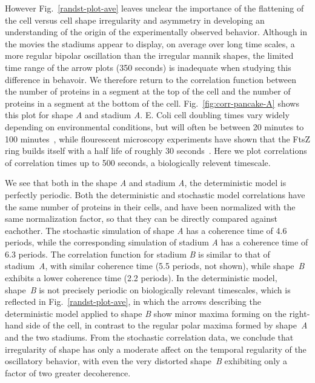 \documentclass{pnastwo}
\begin{document}
\begin{article}
However Fig.~\ref{randst-plot-ave} leaves unclear the importance of
the flattening of the cell versus cell shape irregularity and
asymmetry in developing an understanding of the origin of the
experimentally observed behavior.  Although in the movies the stadiums
appear to display, on average over long time scales, a more regular
bipolar oscillation than the irregular mannik shapes, the limited time
range of the arrow plots (350 seconds) is inadequate when studying
this difference in behavoir.  We therefore return to the correlation
function between the number of proteins in a segment at the top of the
cell and the number of proteins in a segment at the bottom of the
cell.  Fig.~\ref{fig:corr-pancake-A} shows this plot for shape
\emph{A} and stadium \emph{A}.  E. Coli cell doubling times vary
widely depending on environmental conditions, but will often be
between 20 minutes to 100 minutes~\cite{pierucci1972chromosome}, while
flourescent microscopy experiments have shown that the FtsZ ring
builds itself with a half life of roughly 30
seconds~\cite{stricker2002rapid}.  Here we plot correlations of
correlation times up to 500 seconds, a biologically relevent
timescale.


We see that both in the shape \emph{A} and stadium \emph{A}, the
deterministic model is perfectly periodic.  Both the deterministic and
stochastic model correlations have the same number of proteins in
their cells, and have been normalized with the same normalization
factor, so that they can be directly compared against eachother.  The
stochastic simulation of shape \emph{A} has a coherence time of 4.6
periods, while the corresponding simulation of stadium \emph{A} has a
coherence time of 6.3 periods.
%
The correlation function for stadium \emph{B} is similar to that of
stadium~\emph{A}, with similar coherence time (5.5 periods, not
shown), while shape~\emph{B} exhibits a lower coherence time (2.2
periods).  In the deterministic model, shape~\emph{B} is not precisely
periodic on biologically relevant timescales, which is reflected in
Fig.~\ref{randst-plot-ave}, in which the arrows describing the
deterministic model applied to shape \emph{B} show minor maxima
forming on the right-hand side of the cell, in contrast to the regular
polar maxima formed by shape~\emph{A} and the two stadiums.
%
From the stochastic correlation data, we conclude that irregularity of
shape has only a moderate affect on the temporal regularity of the
oscillatory behavior, with even the very distorted shape~\emph{B}
exhibiting only a factor of two greater decoherence.


\end{article}
\end{document}
